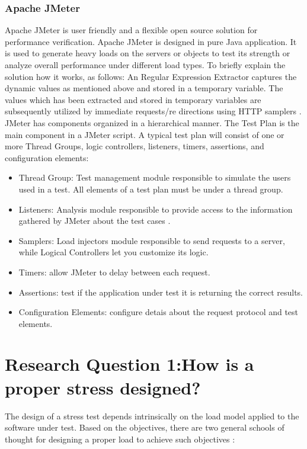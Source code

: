 \documentclass{report}
\begin{document}
\subsubsection{Apache JMeter}


Apache JMeter is user friendly and a flexible open source solution for performance verification. Apache JMeter is designed in pure Java application. It is used to generate heavy loads on the servers or objects to test its strength or analyze overall performance under different load types. To briefly explain the solution how it works, as follows: An Regular Expression Extractor captures the dynamic values as mentioned above and stored in a temporary variable. The values which has been extracted and stored in temporary variables are subsequently utilized by immediate requests/re directions using HTTP samplers \cite{Kiran2015}. JMeter has components organized  in a hierarchical manner. The Test Plan is the main component in a JMeter script. A typical test plan will consist of one or more Thread Groups, logic controllers, listeners, timers, assertions, and configuration elements:

\begin{itemize}
\item Thread Group: Test management module responsible to simulate the users used in a test. All elements of a test plan must be under a thread group.
\item Listeners: Analysis module responsible to provide access to the information gathered by JMeter about the test cases .
\item Samplers: Load injectors module responsible to send requests to a server, while Logical Controllers let you customize its logic.
\item Timers: allow JMeter to delay between each request.
\item Assertions: test if the application under test it is returning the correct results.
\item Configuration Elements: configure detais about the request protocol and test elements.
\end{itemize}

\FloatBarrier

\section{Research Question 1:How is a proper stress designed?}


The design of a stress test depends intrinsically on the load model applied to the software under test. Based on the objectives, there are two general schools of thought for designing a proper load to achieve such objectives \cite{Afzal2009a}:
\end{document}
